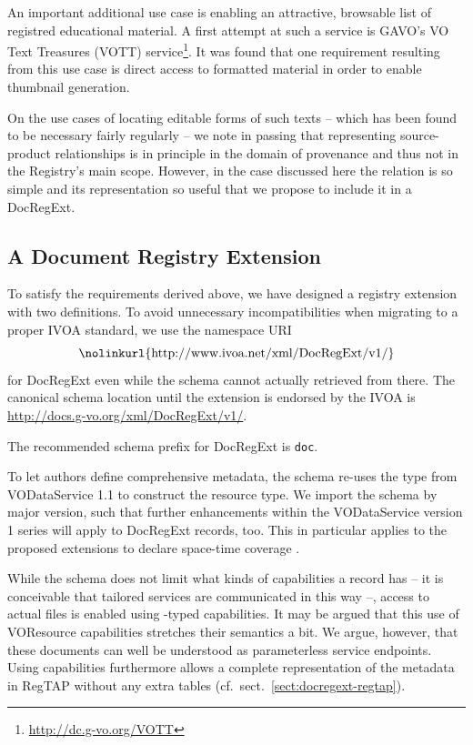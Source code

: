 \documentclass{ivoa}
\begin{document}
An important additional use case is enabling an attractive, browsable
list of registred educational material.  A first attempt at such a
service is GAVO's VO Text Treasures (VOTT)
service\footnote{\url{http://dc.g-vo.org/VOTT}}.  It was found that one
requirement resulting from this use case is direct access to formatted
material in order to enable thumbnail generation.

On the use cases of locating editable forms of such texts – which
has been found to be necessary fairly regularly – we note in passing
that representing source-product relationships is in principle in the
domain of provenance and thus not in the Registry's main scope. However, in
the case discussed here the relation is so simple and its representation
so useful that we propose to include it in a DocRegExt.

\subsection{A Document Registry Extension}


\label{sect:regext-ext}

To satisfy the requirements derived above, we have designed a registry extension with
two definitions. 
To avoid unnecessary incompatibilities when migrating to a proper IVOA
standard, we use the namespace URI
$$\hbox{\nolinkurl{http://www.ivoa.net/xml/DocRegExt/v1/}}$$
for DocRegExt even while the schema cannot actually retrieved from
there.  The canonical schema location until the extension is endorsed by
the IVOA is \url{http://docs.g-vo.org/xml/DocRegExt/v1/}.

The recommended schema prefix for DocRegExt is \texttt{doc}.

To let authors define comprehensive metadata, the schema
re-uses the  type
from VODataService 1.1 \citep{2010ivoa.spec.1202P} to construct
the  resource type.  We import the schema by major
version, such that further enhancements within the VODataService version
1 series will apply to DocRegExt records, too.  This in particular
applies to the proposed extensions to declare space-time coverage
\citep{note:regstc}.

While the schema does not limit what kinds of capabilities a
 record has -- it is conceivable that tailored
services are communicated in this way --, access to actual files is
enabled using -typed capabilities.  It may be
argued that this use of VOResource capabilities stretches their
semantics a bit.  We argue, however, that these documents can well be
understood as parameterless service endpoints.  Using capabilities
furthermore allows a complete representation of the metadata in RegTAP
without any extra tables (cf.~sect.~\ref{sect:docregext-regtap}).
\end{document}
